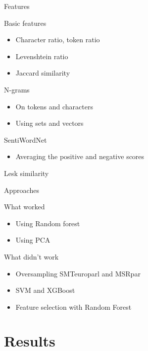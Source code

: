 \documentclass{beamer}
\begin{document}
\begin{frame}{Features}
    \begin{block}{Basic features}
        \begin{itemize}
            \item Character ratio, token ratio
            \item Levenshtein ratio
            \item Jaccard similarity
        \end{itemize}
    \end{block}
    \begin{block}{N-grams}
        \begin{itemize}
            \item On tokens and characters
            \item Using sets and vectors
        \end{itemize}
    \end{block}
    \begin{block}{SentiWordNet}
        \begin{itemize}
            \item Averaging the positive and negative scores
        \end{itemize}
    \end{block}
    Lesk similarity
\end{frame}

\begin{frame}{Approaches}
    \begin{block}{What worked}
        \begin{itemize}
            \item Using Random forest
            \item Using PCA
        \end{itemize}
    \end{block}
    \begin{block}{What didn't work}
        \begin{itemize}
            \item Oversampling SMTeuroparl and MSRpar
            \item SVM and XGBoost
            \item Feature selection with Random Forest
        \end{itemize}
    \end{block}
\end{frame}



\section{Results}
\end{document}
